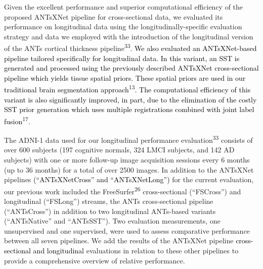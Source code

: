 \documentclass[12pt,]{article}
\begin{document}
Given the excellent performance and superior computational efficiency of
the proposed ANTsXNet pipeline for cross-sectional data, we evaluated
its performance on longitudinal data using the longitudinally-specific
evaluation strategy and data we employed with the introduction of the
longitudinal version of the ANTs cortical thickness
pipeline\textsuperscript{33}. \textcolor{black}{
We also evaluated an ANTsXNet-based pipeline tailored specifically for longitudinal
data.  In this variant, an SST is generated and processed using the previously
described ANTsXNet cross-sectional pipeline which yields tissue spatial priors.
These spatial priors are used in our traditional brain segmentation approach}\textsuperscript{13}\textcolor{black}{.  The computational efficiency of this variant is also
significantly improved, in part, due to the elimination of the costly SST prior generation
which uses multiple registrations combined with joint label fusion}\textsuperscript{17}.

The ADNI-1 data used for our longitudinal performance
evaluation\textsuperscript{33} consists of over 600 subjects (197
cognitive normals, 324 LMCI subjects, and 142 AD subjects) with one or
more follow-up image acquisition sessions every 6 months (up to 36
months) for a total of over 2500 images. In addition to the ANTsXNet
pipelines \textcolor{black}{(``ANTsXNetCross'' and
``ANTsXNetLong'')} for the current evaluation, our previous work
included the FreeSurfer\textsuperscript{26} cross-sectional
(``FSCross'') and longitudinal (``FSLong'') streams, the ANTs
cross-sectional pipeline (``ANTsCross'') in addition to two longitudinal
ANTs-based variants (``ANTsNative'' and ``ANTsSST''). Two evaluation
measurements, one unsupervised and one supervised, were used to assess
comparative performance between all seven pipelines. We add the results
of the ANTsXNet pipeline
\textcolor{black}{cross-sectional and longitudinal} evaluations in
relation to these other pipelines to provide a comprehensive overview of
relative performance.
\end{document}
